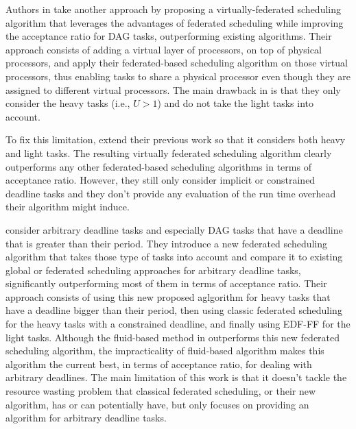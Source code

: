 Authors in \cite{JiangVirtuallyFederatedSched2021}
take another approach by proposing a virtually-federated 
scheduling algorithm that leverages the advantages
of federated scheduling while improving the acceptance 
ratio for DAG tasks, outperforming existing algorithms.
Their approach consists of adding a virtual layer
of processors, on top of physical processors,
and apply their federated-based scheduling algorithm on those virtual processors,
thus enabling tasks to share a physical processor
even though they are assigned to different virtual processors.
The main drawback in \cite{JiangVirtuallyFederatedSched2021}
is that they only consider the heavy tasks (i.e., $U > 1$)
and do not take the light tasks into account.

To fix this limitation, \cite{Jiang2023SchedVirtualProcs}
extend their previous work\cite{JiangVirtuallyFederatedSched2021}
so that it considers both heavy and light tasks.
The resulting virtually federated scheduling algorithm
clearly outperforms any other federated-based scheduling algorithms
in terms of acceptance ratio.
However, they still only consider implicit or constrained deadline tasks
and they don't provide any evaluation of the run time overhead 
their algorithm might induce.


\cite{Guan2023FederatedNew} 
consider arbitrary deadline tasks and especially
DAG tasks that have a deadline that is greater than their period.
They introduce a new federated scheduling algorithm 
that takes those type of tasks into account 
and compare it to existing global or federated scheduling approaches
for arbitrary deadline tasks, significantly outperforming
most of them in terms of acceptance ratio.
Their approach consists of using this new proposed aglgorithm 
for heavy tasks that have a deadline bigger than their period,
then using classic federated scheduling for the heavy tasks with a 
constrained deadline, and finally using EDF-FF for the light tasks.
Although the fluid-based method in \cite{GuanFluidDag2022}
outperforms this new federated scheduling algorithm,
the impracticality of fluid-based algorithm makes this algorithm
the current best, in terms of acceptance ratio, for dealing with arbitrary
deadlines. The main limitation of this work 
is that it doesn't tackle the resource wasting problem 
that classical federated scheduling, or their new algorithm, has or can potentially have, but only
focuses on providing an algorithm for arbitrary deadline tasks.

